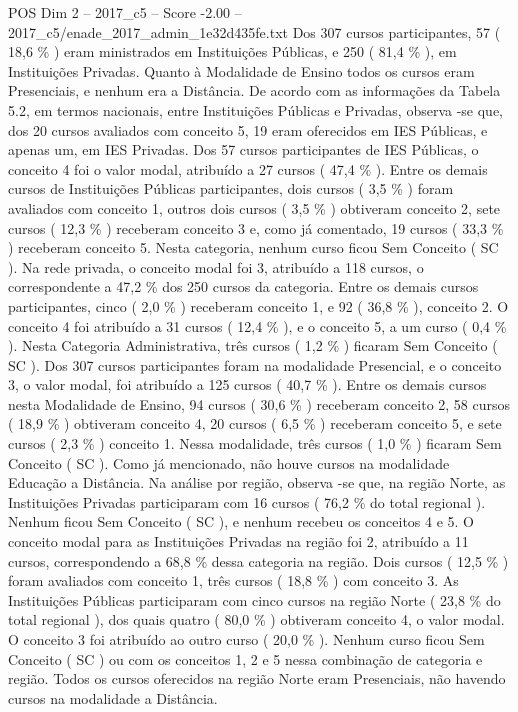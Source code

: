 \begin{textsample}{POS Dim 2 – 2017\_c5 – Score -2.00 – 2017\_c5/enade\_2017\_admin\_1e32d435fe.txt}
Dos 307 cursos participantes, 57 ( 18,6 \% ) eram ministrados em Instituições Públicas, e 250 ( 81,4 \% ), em Instituições Privadas.
Quanto à Modalidade de Ensino todos os cursos eram Presenciais, e nenhum era a Distância.
De acordo com as informações da Tabela 5.2, em termos nacionais, entre Instituições Públicas e Privadas, observa -se que, dos 20 cursos avaliados com conceito 5, 19 eram oferecidos em IES Públicas, e apenas um, em IES Privadas.
Dos 57 cursos participantes de IES Públicas, o conceito 4 foi o valor modal, atribuído a 27 cursos ( 47,4 \% ).
Entre os demais cursos de Instituições Públicas participantes, dois cursos ( 3,5 \% ) foram avaliados com conceito 1, outros dois cursos ( 3,5 \% ) obtiveram conceito 2, sete cursos ( 12,3 \% ) receberam conceito 3 e, como já comentado, 19 cursos ( 33,3 \% ) receberam conceito 5.
Nesta categoria, nenhum curso ficou Sem Conceito ( SC ).
Na rede privada, o conceito modal foi 3, atribuído a 118 cursos, o correspondente a 47,2 \% dos 250 cursos da categoria.
Entre os demais cursos participantes, cinco ( 2,0 \% ) receberam conceito 1, e 92 ( 36,8 \% ), conceito 2.
O conceito 4 foi atribuído a 31 cursos ( 12,4 \% ), e o conceito 5, a um curso ( 0,4 \% ).
Nesta Categoria Administrativa, três cursos ( 1,2 \% ) ficaram Sem Conceito ( SC ).
Dos 307 cursos participantes foram na modalidade Presencial, e o conceito 3, o valor modal, foi atribuído a 125 cursos ( 40,7 \% ).
Entre os demais cursos nesta Modalidade de Ensino, 94 cursos ( 30,6 \% ) receberam conceito 2, 58 cursos ( 18,9 \% ) obtiveram conceito 4, 20 cursos ( 6,5 \% ) receberam conceito 5, e sete cursos ( 2,3 \% ) conceito 1.
Nessa modalidade, três cursos ( 1,0 \% ) ficaram Sem Conceito ( SC ).
Como já mencionado, não houve cursos na modalidade Educação a Distância.
Na análise por região, observa -se que, na região Norte, as Instituições Privadas participaram com 16 cursos ( 76,2 \% do total regional ).
Nenhum ficou Sem Conceito ( SC ), e nenhum recebeu os conceitos 4 e 5.
O conceito modal para as Instituições Privadas na região foi 2, atribuído a 11 cursos, correspondendo a 68,8 \% dessa categoria na região.
Dois cursos ( 12,5 \% ) foram avaliados com conceito 1, três cursos ( 18,8 \% ) com conceito 3.
As Instituições Públicas participaram com cinco cursos na região Norte ( 23,8 \% do total regional ), dos quais quatro ( 80,0 \% ) obtiveram conceito 4, o valor modal.
O conceito 3 foi atribuído ao outro curso ( 20,0 \% ).
Nenhum curso ficou Sem Conceito ( SC ) ou com os conceitos 1, 2 e 5 nessa combinação de categoria e região.
Todos os cursos oferecidos na região Norte eram Presenciais, não havendo cursos na modalidade a Distância.

\end{textsample}
